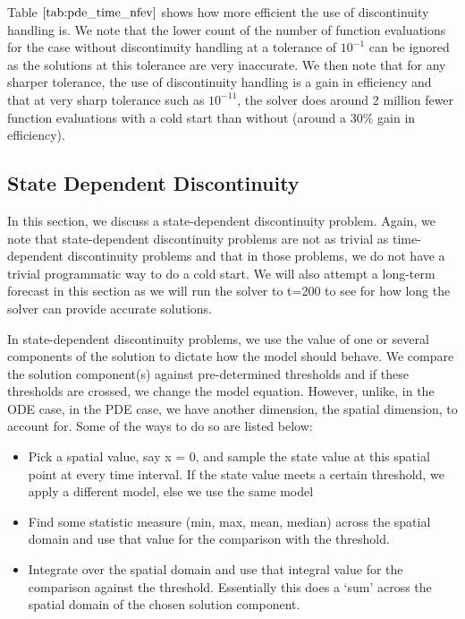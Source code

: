 \documentclass{article}
\begin{document}
Table $\ref{tab:pde_time_nfev}$ shows how more efficient the use of discontinuity handling is. We note that the lower count of the number of function evaluations for the case without discontinuity handling at a tolerance of $10^{-1}$ can be ignored as the solutions at this tolerance are very inaccurate. We then note that for any sharper tolerance, the use of discontinuity handling is a gain in efficiency and that at very sharp tolerance such as $10^{-11}$, the solver does around 2 million fewer function evaluations with a cold start than without (around a $30\%$ gain in efficiency). 

\subsection{State Dependent Discontinuity}
\label{subsection:pde_state_intro}
In this section, we discuss a state-dependent discontinuity problem. Again, we note that state-dependent discontinuity problems are not as trivial as time-dependent discontinuity problems and that in those problems, we do not have a trivial programmatic way to do a cold start. We will also attempt a long-term forecast in this section as we will run the solver to t=200 to see for how long the solver can provide accurate solutions.

In state-dependent discontinuity problems, we use the value of one or several components of the solution to dictate how the model should behave. We compare the solution component(s) against pre-determined thresholds and if these thresholds are crossed, we change the model equation. However, unlike, in the ODE case, in the PDE case, we have another dimension, the spatial dimension, to account for. Some of the ways to do so are listed below:
\begin{itemize}
\item Pick a spatial value, say x = 0, and sample the state value at this spatial point at every time interval. If the state value meets a certain threshold, we apply a different model, else we use the same model

\item Find some statistic measure (min, max, mean, median) across the spatial domain and use that value for the comparison with the threshold.

\item Integrate over the spatial domain and use that integral value for the comparison against the threshold. Essentially this does a `sum' across the spatial domain of the chosen solution component.
\end{itemize}
\end{document}
